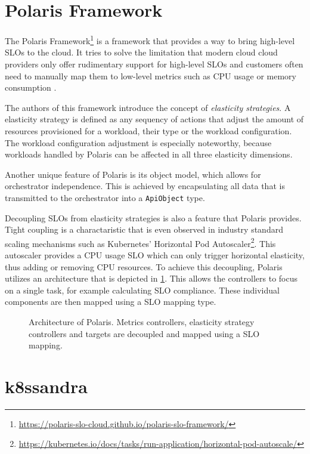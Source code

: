\section{Polaris Framework}
\label{sec:polaris}

The Polaris Framework\footnote{\url{https://polaris-slo-cloud.github.io/polaris-slo-framework/}} is a framework that provides a way to bring high-level SLOs to the cloud. It tries to solve the limitation that modern cloud cloud providers only offer rudimentary support for high-level SLOs and customers often need to manually map them to low-level metrics such as CPU usage or memory consumption \cite{pusztaiSLOScriptNovel2021}.

The authors of this framework introduce the concept of \textit{elasticity strategies}. A elasticity strategy is defined as any sequency of actions that adjust the amount of resources provisioned for a workload, their type or the workload configuration. The workload configuration adjustment is especially noteworthy, because workloads handled by Polaris can be affected in all three elasticity dimensions.

Another unique feature of Polaris is its object model, which allows for orchestrator independence. This is achieved by encapsulating all data that is transmitted to the orchestrator into a \texttt{ApiObject} type.

Decoupling SLOs from elasticity strategies is also a feature that Polaris provides. Tight coupling is a charactaristic that is even observed in industry standard scaling mechanisms such as Kubernetes' Horizontal Pod Autoscaler\footnote{\raggedright\url{https://kubernetes.io/docs/tasks/run-application/horizontal-pod-autoscale/}}. This autoscaler provides a CPU usage SLO which can only trigger horizontal elasticity, thus adding or removing CPU resources. To achieve this decoupling, Polaris utilizes an architecture that is depicted in \cref{fig:polaris-architecture}. This allows the controllers to focus on a single task, for example calculating SLO compliance. These individual components are then mapped using a SLO mapping type.

\begin{figure}
    \centering
    \caption{Architecture of Polaris. Metrics controllers, elasticity strategy controllers and targets are decoupled and mapped using a SLO mapping.}
    \label{fig:polaris-architecture}
\end{figure}

\section{k8ssandra}
\label{sec:k8ssandra}


